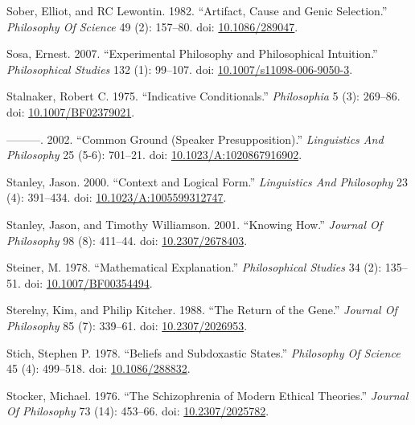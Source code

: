 \documentclass[
  10pt,
  letterpaper,
  DIV=11,
  numbers=noendperiod,
  twoside]{scrartcl}
\newlength{\cslhangindent}
\newenvironment{CSLReferences}[2] %
 {\begin{list}{}{%
  \setlength{\itemindent}{0pt}
  \setlength{\leftmargin}{0pt}
  \setlength{\parsep}{0pt}
  \ifodd #1
   \setlength{\leftmargin}{\cslhangindent}
   \setlength{\itemindent}{-1\cslhangindent}
  \fi
  \setlength{\itemsep}{#2\baselineskip}}}
 {\end{list}}
\begin{document}
\begin{CSLReferences}{1}{0}
Sober, Elliot, and RC Lewontin. 1982. {``Artifact, Cause and Genic
Selection.''} \emph{Philosophy Of Science} 49 (2): 157--80. doi:
\href{https://doi.org/10.1086/289047}{10.1086/289047}.

Sosa, Ernest. 2007. {``Experimental Philosophy and Philosophical
Intuition.''} \emph{Philosophical Studies} 132 (1): 99--107. doi:
\href{https://doi.org/10.1007/s11098-006-9050-3}{10.1007/s11098-006-9050-3}.

Stalnaker, Robert C. 1975. {``Indicative Conditionals.''}
\emph{Philosophia} 5 (3): 269--86. doi:
\href{https://doi.org/10.1007/BF02379021}{10.1007/BF02379021}.

---------. 2002. {``Common Ground (Speaker Presupposition).''}
\emph{Linguistics And Philosophy} 25 (5-6): 701--21. doi:
\href{https://doi.org/10.1023/A:1020867916902}{10.1023/A:1020867916902}.

Stanley, Jason. 2000. {``Context and Logical Form.''} \emph{Linguistics
And Philosophy} 23 (4): 391--434. doi:
\href{https://doi.org/10.1023/A:1005599312747}{10.1023/A:1005599312747}.

Stanley, Jason, and Timothy Williamson. 2001. {``Knowing How.''}
\emph{Journal Of Philosophy} 98 (8): 411--44. doi:
\href{https://doi.org/10.2307/2678403}{10.2307/2678403}.

Steiner, M. 1978. {``Mathematical Explanation.''} \emph{Philosophical
Studies} 34 (2): 135--51. doi:
\href{https://doi.org/10.1007/BF00354494}{10.1007/BF00354494}.

Sterelny, Kim, and Philip Kitcher. 1988. {``The Return of the Gene.''}
\emph{Journal Of Philosophy} 85 (7): 339--61. doi:
\href{https://doi.org/10.2307/2026953}{10.2307/2026953}.

Stich, Stephen P. 1978. {``Beliefs and Subdoxastic States.''}
\emph{Philosophy Of Science} 45 (4): 499--518. doi:
\href{https://doi.org/10.1086/288832}{10.1086/288832}.

Stocker, Michael. 1976. {``The Schizophrenia of Modern Ethical
Theories.''} \emph{Journal Of Philosophy} 73 (14): 453--66. doi:
\href{https://doi.org/10.2307/2025782}{10.2307/2025782}.


\end{CSLReferences}
\end{document}

